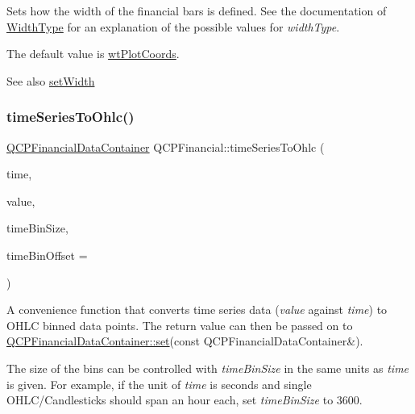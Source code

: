Sets how the width of the financial bars is defined. See the documentation of \mbox{\hyperlink{class_q_c_p_financial_aef1761dda71a53dc5269685e9e492626}{Width\+Type}} for an explanation of the possible values for {\itshape width\+Type}.

The default value is \mbox{\hyperlink{class_q_c_p_financial_aef1761dda71a53dc5269685e9e492626af676bc8dbe700b96b333329c9dbfc30f}{wt\+Plot\+Coords}}.

\begin{DoxySeeAlso}{See also}
\mbox{\hyperlink{class_q_c_p_financial_a99633f8bac86a61d534ae5eeb1a3068f}{set\+Width}} 
\end{DoxySeeAlso}
\mbox{\label{class_q_c_p_financial_a9a058c035040d3939b8884f4aaccb1a7}} 
\subsubsection{\texorpdfstring{time\+Series\+To\+Ohlc()}{timeSeriesToOhlc()}}
{\footnotesize\ttfamily \mbox{\hyperlink{class_q_c_p_data_container}{Q\+C\+P\+Financial\+Data\+Container}} Q\+C\+P\+Financial\+::time\+Series\+To\+Ohlc (\begin{DoxyParamCaption}\item[{const Q\+Vector$<$ double $>$ \&}]{time,  }\item[{const Q\+Vector$<$ double $>$ \&}]{value,  }\item[{double}]{time\+Bin\+Size,  }\item[{double}]{time\+Bin\+Offset = {} }\end{DoxyParamCaption})\hspace{0.3cm}{\ttfamily [static]}}

A convenience function that converts time series data ({\itshape value} against {\itshape time}) to O\+H\+LC binned data points. The return value can then be passed on to \mbox{\hyperlink{class_q_c_p_data_container_ae7042bd534fc3ce7befa2ce3f790b5bf}{Q\+C\+P\+Financial\+Data\+Container\+::set}}(const Q\+C\+P\+Financial\+Data\+Container\&).

The size of the bins can be controlled with {\itshape time\+Bin\+Size} in the same units as {\itshape time} is given. For example, if the unit of {\itshape time} is seconds and single O\+H\+L\+C/\+Candlesticks should span an hour each, set {\itshape time\+Bin\+Size} to 3600.

